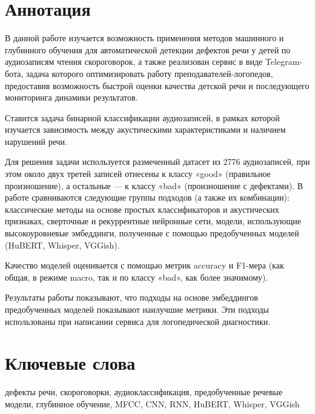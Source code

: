 \documentclass[a4paper,14pt]{extarticle}
\begin{document}
\newpage
\setcounter{page}{2}

{
	\hypersetup{linkcolor=black}
	\tableofcontents
}

\newpage

\newpage
\section*{Аннотация}
В данной работе изучается возможность применения методов машинного и глубинного обучения для автоматической детекции дефектов речи у детей по аудиозаписям чтения скороговорок, а также реализован сервис в виде Telegram-бота, задача которого оптимизировать работу преподавателей-логопедов, предоставив возможность быстрой оценки качества детской речи и последующего мониторинга динамики результатов.

Ставится задача бинарной классификации аудиозаписей, в рамках которой изучается зависимость между акустическими характеристиками и наличием нарушений речи.

Для решения задачи используется размеченный датасет из 2776 аудиозаписей, при этом около двух третей записей отнесены к классу «good» (правильное произношение), а остальные — к классу «bad» (произношение с дефектами). В работе сравниваются следующие группы подходов (а также их комбинации): классические методы на основе простых классификаторов и акустических признаках, сверточные и рекуррентные нейронные сети, модели, использующие высокоуровневые эмбеддинги, полученные с помощью предобученных моделей (HuBERT, Whisper, VGGish).

Качество моделей оценивается с помощью метрик accuracy и F1-мера (как общая, в режиме macro, так и по классу «bad», как более значимому). 

Результаты работы показывают, что подходы на основе эмбеддингов предобученных моделей показывают наилучшие метрики. Эти подходы использованы при написании сервиса для логопедической диагностики.

\section*{Ключевые слова}
дефекты речи, скороговорки, аудиоклассификация, предобученные речевые модели, глубинное обучение, MFCC, CNN, RNN, HuBERT, Whisper, VGGish
\end{document}
